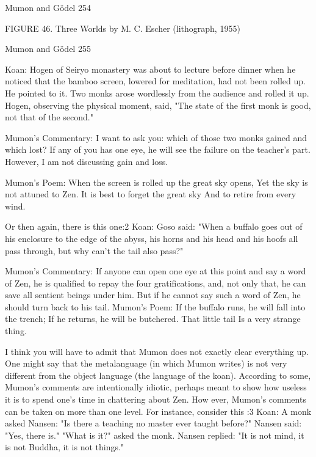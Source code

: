 Mumon and Gödel                                                                        254

          FIGURE 46. Three Worlds by M. C. Escher (lithograph, 1955)




Mumon and Gödel                                                        255

Koan:
Hogen of Seiryo monastery was about to lecture before dinner when he noticed that the bamboo screen,
lowered for meditation, had not been rolled up. He pointed to it. Two monks arose wordlessly from the
audience and rolled it up. Hogen, observing the physical moment, said, "The state of the first monk is good,
not that of the second."

Mumon's Commentary:
I want to ask you: which of those two monks gained and which lost? If any of you has one eye, he will see
the failure on the teacher's part. However, I am not discussing gain and loss.

Mumon's Poem:
        When the screen is rolled up the great sky opens,
        Yet the sky is not attuned to Zen.
        It is best to forget the great sky
        And to retire from every wind.

Or then again, there is this one:2
        Koan:
        Goso said: "When a buffalo goes out of his enclosure to the edge of the abyss, his horns and his
        head and his hoofs all pass through, but why can't the tail also pass?"

Mumon's Commentary:
If anyone can open one eye at this point and say a word of Zen, he is qualified to repay
the four gratifications, and, not only that, he can save all sentient beings under him. But if
he cannot say such a word of Zen, he should turn back to his tail.
Mumon's Poem:
        If the buffalo runs, he will fall into the trench;
        If he returns, he will be butchered.
        That little tail
        Is a very strange thing.

I think you will have to admit that Mumon does not exactly clear everything up. One
might say that the metalanguage (in which Mumon writes) is not very different from the
object language (the language of the koan). According to some, Mumon's comments are
intentionally idiotic, perhaps meant to show how useless it is to spend one's time in
chattering about Zen. How ever, Mumon's comments can be taken on more than one
level. For instance, consider this :3
Koan:
A monk asked Nansen: "Is there a teaching no master ever taught before?"
Nansen said: "Yes, there is."
"What is it?" asked the monk.
Nansen replied: "It is not mind, it is not Buddha, it is not things."




